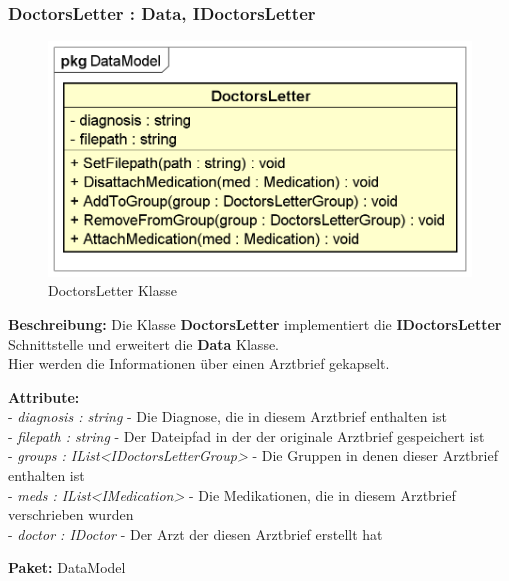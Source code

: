 \documentclass[a4paper]{scrreprt}
\begin{document}
\subsubsection{DoctorsLetter : Data, IDoctorsLetter}
\begin{figure}[H]
\centering
\includegraphics[width=0.75\textheight]{graphics/Klassendiagramme/Model/DoctorsLetter.png}
\caption{DoctorsLetter Klasse}
\end{figure}
\textbf{Beschreibung:} Die Klasse \textbf{DoctorsLetter} implementiert die \textbf{IDoctorsLetter} Schnittstelle und erweitert die \textbf{Data} Klasse.\\
Hier werden die Informationen über einen  Arztbrief gekapselt.

\textbf{Attribute:}\\ 
- \textit{diagnosis : string} - Die Diagnose, die in diesem Arztbrief enthalten ist\\
- \textit{filepath : string} - Der Dateipfad in der der originale Arztbrief gespeichert ist\\
- \textit{groups : IList<IDoctorsLetterGroup>} - Die Gruppen in denen dieser Arztbrief enthalten ist\\
- \textit{meds : IList<IMedication>} - Die Medikationen, die in diesem Arztbrief verschrieben wurden\\
- \textit{doctor : IDoctor} - Der Arzt der diesen Arztbrief erstellt hat

\textbf{Paket:} DataModel
\end{document}
